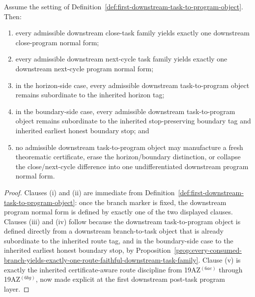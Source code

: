 \begin{proposition}
\label{prop:every-downstream-task-family-yields-exactly-one-compact-downstream-program-normal-form}
Assume the setting of Definition~\ref{def:first-downstream-task-to-program-object}. Then:
\begin{enumerate}[label=(\roman*)]
  \item every admissible downstream close-task family yields exactly one downstream close-program normal form;
  \item every admissible downstream next-cycle task family yields exactly one downstream next-cycle program normal form;
  \item in the horizon-side case, every admissible downstream task-to-program object remains subordinate to the inherited horizon tag;
  \item in the boundary-side case, every admissible downstream task-to-program object remains subordinate to the inherited stop-preserving boundary tag and inherited earliest honest boundary stop; and
  \item no admissible downstream task-to-program object may manufacture a fresh theorematic certificate, erase the horizon/boundary distinction, or collapse the close/next-cycle difference into one undifferentiated downstream program normal form.
\end{enumerate}
\end{proposition}

\begin{proof}
Clauses (i) and (ii) are immediate from Definition~\ref{def:first-downstream-task-to-program-object}: once the branch marker is fixed, the downstream program normal form is defined by exactly one of the two displayed clauses. Clauses (iii) and (iv) follow because the downstream task-to-program object is defined directly from a downstream branch-to-task object that is already subordinate to the inherited route tag, and in the boundary-side case to the inherited earliest honest boundary stop, by Proposition~\ref{prop:every-consumed-branch-yields-exactly-one-route-faithful-downstream-task-family}. Clause (v) is exactly the inherited certificate-aware route discipline from 19AZ$^{(6ae)}$ through 19AZ$^{(6bg)}$, now made explicit at the first downstream post-task program layer.
\end{proof}

